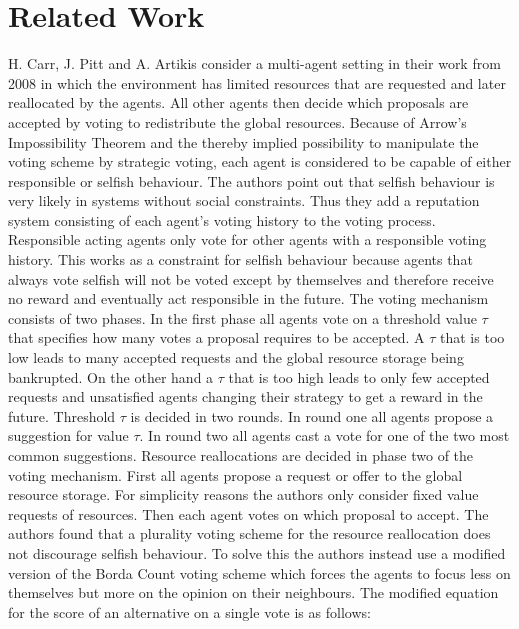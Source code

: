 \documentclass[conference]{IEEEtran}
\begin{document}
\section{Related Work}\label{3RelatedWork}
H. Carr, J. Pitt and A. Artikis consider a multi-agent setting in their work \cite{carr2008peer} from 2008 in which the environment has limited resources that are requested and later reallocated by the agents. All other agents then decide which proposals are accepted by voting to redistribute the global resources.
\newline
Because of Arrow's Impossibility Theorem and the thereby implied possibility to manipulate the voting scheme by strategic voting, each agent is considered to be capable of either responsible or selfish behaviour. The authors point out that selfish behaviour is very likely in systems without social constraints.
Thus they add a reputation system consisting of each agent's voting history to the voting process. Responsible acting agents only vote for other agents with a responsible voting history. This works as a constraint for selfish behaviour because agents that always vote selfish will not be voted except by themselves and therefore receive no reward and eventually act responsible in the future.
\newline
The voting mechanism consists of two phases. In the first phase all agents vote on a threshold value $\tau$ that specifies how many votes a proposal requires to be accepted. A $\tau$ that is too low leads to many accepted requests and the global resource storage being bankrupted. On the other hand a $\tau$ that is too high leads to only few accepted requests and unsatisfied agents changing their strategy to get a reward in the future.
Threshold $\tau$ is decided in two rounds. In round one all agents propose a suggestion for value $\tau$. In round two all agents cast a vote for one of the two most common suggestions.
Resource reallocations are decided in phase two of the voting mechanism. First all agents propose a request or offer to the global resource storage. For simplicity reasons the authors only consider fixed value requests of resources. Then each agent votes on which proposal to accept. The authors found that a plurality voting scheme for the resource reallocation does not discourage selfish behaviour. To solve this the authors instead use a modified version of the Borda Count voting scheme which forces the agents to focus less on themselves but more on the opinion on their neighbours. The modified equation for the score of an alternative on a single vote is as follows:\\
\end{document}
